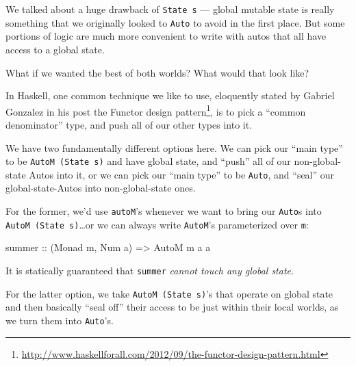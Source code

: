 \documentclass[]{article}
\newenvironment{Shaded}{}{}
\newcommand{\DataTypeTok}[1]{\textcolor[rgb]{0.56,0.13,0.00}{#1}}
\newcommand{\NormalTok}[1]{#1}
\newcommand{\OtherTok}[1]{\textcolor[rgb]{0.00,0.44,0.13}{#1}}
\renewcommand{\href}[2]{#2\footnote{\url{#1}}}
\begin{document}
We talked about a huge drawback of \texttt{State\ s} --- global mutable state is
really something that we originally looked to \texttt{Auto} to avoid in the
first place. But some portions of logic are much more convenient to write with
autos that all have access to a global state.

What if we wanted the best of both worlds? What would that look like?

In Haskell, one common technique we like to use, eloquently stated by Gabriel
Gonzalez in his post
\href{http://www.haskellforall.com/2012/09/the-functor-design-pattern.html}{the
Functor design pattern}, is to pick a ``common denominator'' type, and push all
of our other types into it.

We have two fundamentally different options here. We can pick our ``main type''
to be \texttt{AutoM\ (State\ s)} and have global state, and ``push'' all of our
non-global-state Autos into it, or we can pick our ``main type'' to be
\texttt{Auto}, and ``seal'' our global-state-Autos into non-global-state ones.

For the former, we'd use \texttt{autoM}'s whenever we want to bring our
\texttt{Auto}s into \texttt{AutoM\ (State\ s)}\ldots{}or we can always write
\texttt{AutoM}'s parameterized over \texttt{m}:

\begin{Shaded}
\begin{Highlighting}[]
\OtherTok{summer ::}\NormalTok{ (}\DataTypeTok{Monad}\NormalTok{ m, }\DataTypeTok{Num}\NormalTok{ a) }\OtherTok{=>} \DataTypeTok{AutoM}\NormalTok{ m a a}
\end{Highlighting}
\end{Shaded}

It is statically guaranteed that \texttt{summer} \emph{cannot touch any global
state}.

For the latter option, we take \texttt{AutoM\ (State\ s)}'s that operate on
global state and then basically ``seal off'' their access to be just within
their local worlds, as we turn them into \texttt{Auto}'s.
\end{document}
